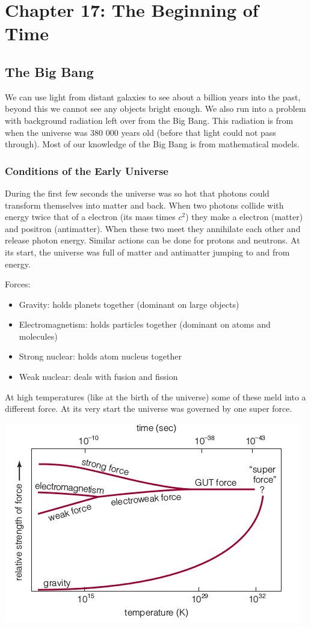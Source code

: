 \section{Chapter 17: The Beginning of Time}
\subsection{The Big Bang}
We can use light from distant galaxies to see about a billion years into the past, beyond this we cannot see any objects bright enough. We also run into a problem with background radiation left over from the Big Bang. This radiation is from when the universe was 380 000 years old (before that light could not pass through). Most of our knowledge of the Big Bang is from mathematical models.

\subsubsection{Conditions of the Early Universe}
During the first few seconds the universe was so hot that photons could transform themselves into matter and back. When two photons collide with energy twice that of a electron (its mass times $c^2$) they make a electron (matter) and positron (antimatter). When these two meet they annihilate each other and release photon energy. Similar actions can be done for protons and neutrons. At its start, the universe was full of matter and antimatter jumping to and from energy.

Forces:
\begin{itemize}
    \item Gravity: holds planets together (dominant on large objects)
    \item Electromagnetism: holds particles together (dominant on atoms and molecules)
    \item Strong nuclear: holds atom nucleus together
    \item Weak nuclear: deals with fusion and fission
\end{itemize}

At high temperatures (like at the birth of the universe) some of these meld into a different force. At its very start the universe was governed by one super force.

\includegraphics[scale=0.5]{forces}

